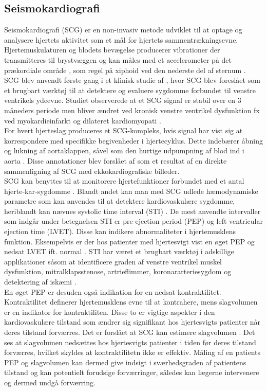 \subsection{Seismokardiografi}
Seismokardiografi (SCG) er en non-invasiv metode udviklet til at optage og analysere hjertets aktivitet som et mål for hjertets sammentrækningsevne. Hjertemuskulaturen og blodets bevægelse producerer vibrationer der transmitteres til brystvæggen og kan måles med et accelerometer på det prækordiale område \citep{inan2015}\citep{Salerno1990}, som regel på xiphoid ved den nederste del af sternum \citep{di2013wearable}.\\
SCG blev anvendt første gang i et klinisk studie af \citet{Salerno1990}, hvor SCG blev foreslået som et brugbart værktøj til at detektere og evaluere sygdomme forbundet til venstre ventrikels ydeevne. Studiet observerede at et SCG signal er stabil over en 3 måneders periode men bliver ændret ved kronisk venstre ventrikel dysfunktion fx ved myokardieinfarkt og dilateret kardiomyopati \citep{Salerno1990}.\\
For hvert hjerteslag produceres et SCG-kompleks, hvis signal har vist sig at korrespondere med specifikke begivenheder i hjertecyklus. Dette indebærer åbning og lukning af aortaklappen, såvel som den hurtige udpumpning af blod ind i aorta \citep{inan2015}. Disse annotationer blev forslået af \citet{crow1994relationship} som et resultat af en direkte sammenligning af SCG med ekkokardiografiske billeder. \\
SCG kan benyttes til at monitorere hjertefunktioner forbundet med et antal hjerte-kar-sygdomme \citep{munir2008}. Blandt andet kan man med SCG udlede hæmodynamiske parametre som kan anvendes til at detektere kardiovaskulære sygdomme, heriblandt kan nævnes systolic time interval (STI) \citep{di2013wearable}. De mest anvendte intervaller som indgår under betegnelsen STI er pre-ejection period (PEP) og left ventricular ejection time (LVET). Disse kan indikere abnormaliteter i hjertemusklens funktion. \citep{Reant2010} Eksempelvis er der hos patienter med hjertesvigt vist en øget PEP og nedsat LVET ift. normal \citep{Marcus2007}.  STI har været et brugbart værktøj i adskillige applikationer såsom at identificere graden af venstre ventrikel muskel dysfunktion, mitralklapsstenose, artrieflimmer, koronararteriesygdom og detektering af iskæmi \citep{Shafiq2016}. \\
En øget PEP er desuden også indikation for en nedsat kontraktilitet. Kontraktilitet definerer hjertemusklens evne til at kontrahere, mens slagvolumen er en indikator for kontraktiliten. Disse to er vigtige aspekter i den kardiovaskulære tilstand som ændrer sig signifikant hos hjertesvigts patienter når deres tilstand forværres. \citep{Ashouri2016} Det er forslået at SCG kan estimere slagvolumen \citep{McKay1999}. Det ses at slagvolumen nedsættes hos hjertesvigts patienter i tiden før deres tilstand forværres, hvilket skyldes at kontraktilitetn ikke er effektiv. Måling af en patients PEP og slagvolumen kan dermed give indsigt i sværhedsgraden af patientens tilstand og kan potentielt forudsige forværringer, således kan lægerne intervenere og dermed undgå forværring. \citep{Ashouri2016}\\



